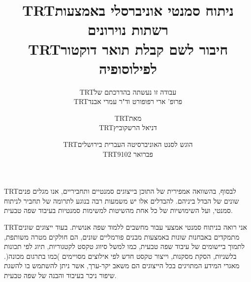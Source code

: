 \documentclass[12pt,a4paper,table]{report}
\newcommand{\heb}[1]{\bgroup\textdir TRT\hebfont #1\egroup}
\begin{document}
\begin{flushright}
\heb{לבסוף, בהשוואה אמפירית של התוכן בייצוגים סמנטיים ותחביריים, אנו מגלים פנים שונים של הבדל ביניהם.
להבדלים אלו יש משמעות רבה בנוגע לתרומה של תחביר לניתוח סמנטי, ועל השימושיות של כל אחת מהשיטות למשימות
סמנטיות בעיבוד שפה טבעית.}

\heb{אני רואה בניתוח סמנטי אמצעי עבור מחשבים ללמוד שפה אנושית.
בעוד ייצוגים שונים מתמקדים באבחנות שונות באמצעות מבנים פורמליים שונים,
הם חולקים מטרה משותפת, לתמוך ביישומים של עיבוד שפה טבעית, כמו למשל
סיווג טקסט לקטגוריות, תיוג לפי תכונות בלשניות,
הסקת מסקנות,
וייצור טקסט חדש לפי אילוצים מסויימים )כמו בתרגום מכונה(.
מאגרי המידע המתויגים בכל הייצוגים הם משאב יקר-ערך,
אשר ניתן להשתמש בו להשגת שיפור ניכר בעיבוד והבנה של שפה טבעית.}
\end{flushright}

\pagebreak

\clearpage

\title{}
\author{
\heb{עבודה זו נעשתה בהדרכתם של} \\
\heb{פרופ' ארי רפופורט וד"ר עמרי אבנד}}
\date{}

\maketitle
\clearpage

\title{
\textbf{\heb{ניתוח סמנטי אוניברסלי באמצעות רשתות נוירונים}} \\
\vspace{2cm}
{\large\heb{חיבור לשם קבלת תואר דוקטור לפילוסופיה}}
}
\author{
\heb{מאת}\\
\heb{דניאל הרשקוביץ}
\vspace{2cm}
}
\date{
\heb{הוגש לסנט האוניברסיטה העברית בירושלים} \\
\heb{פברואר 9102}
}

\maketitle
\maketitle
\end{document}
